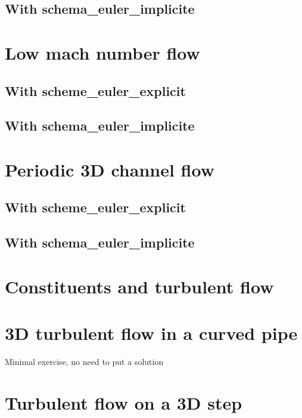 \documentclass[english]{article}
\begin{document}
\subsection{With schema\_euler\_implicite}


\section{Low mach number flow}
\subsection{With scheme\_euler\_explicit}

\subsection{With schema\_euler\_implicite}


\section{Periodic 3D channel flow}
\subsection{With scheme\_euler\_explicit}

\subsection{With schema\_euler\_implicite}


\section{Constituents and turbulent flow}


\section{3D turbulent flow in a curved pipe}
Minimal exercise, no need to put a solution

\section{Turbulent flow on a 3D step}
\end{document}
